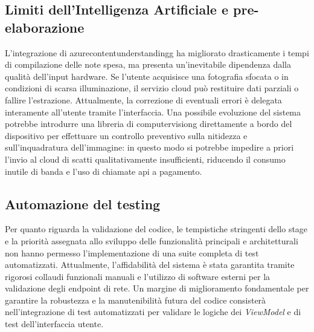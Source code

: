 \subsection*{Limiti dell'Intelligenza Artificiale e pre-elaborazione}
\noindent L'integrazione di \gls{azurecontentunderstandingg} ha migliorato drasticamente i tempi di compilazione delle note spesa, ma presenta un'inevitabile dipendenza dalla qualità dell'input hardware. Se l'utente acquisisce una fotografia sfocata o in condizioni di scarsa illuminazione, il servizio cloud può restituire dati parziali o fallire l'estrazione. Attualmente, la correzione di eventuali errori è delegata interamente all'utente tramite l'interfaccia. Una possibile evoluzione del sistema potrebbe introdurre una libreria di \gls{computervisiong} direttamente a bordo del dispositivo per effettuare un controllo preventivo sulla nitidezza e sull'inquadratura dell'immagine: in questo modo si potrebbe impedire a priori l'invio al cloud di scatti qualitativamente insufficienti, riducendo il consumo inutile di banda e l'uso di chiamate \gls{api} a pagamento.

\subsection*{Automazione del testing}
\noindent Per quanto riguarda la validazione del codice, le tempistiche stringenti dello stage e la priorità assegnata allo sviluppo delle funzionalità principali e architetturali non hanno permesso l'implementazione di una suite completa di test automatizzati. Attualmente, l'affidabilità del sistema è stata garantita tramite rigorosi collaudi funzionali manuali e l'utilizzo di software esterni per la validazione degli endpoint di rete. Un margine di miglioramento fondamentale per garantire la robustezza e la manutenibilità futura del codice consisterà nell'integrazione di test automatizzati per validare le logiche dei \textit{ViewModel} e di test dell'interfaccia utente.

\newpage